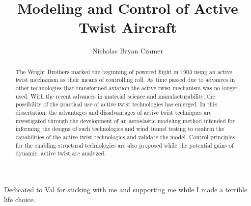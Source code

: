 \documentclass[11pt]{ucthesis}
\begin{document}

\title{Modeling and Control of Active Twist Aircraft}
\author{Nicholas Bryan Cramer}
\deanlinethree{}

\begin{frontmatter}

\maketitle
\copyrightpage

\tableofcontents
\listoffigures
\listoftables

\begin{abstract}
The Wright Brothers marked the beginning of powered flight in 1903 using an active twist mechanism as their means of controlling roll. As time passed due to advances in other technologies that transformed aviation the active twist mechanism was no longer used. With the recent advances in material science and manufacturability, the possibility of the practical use of active twist technologies has emerged. In this dissertation, the advantages and disadvantages of active twist techniques are investigated through the development of an aeroelastic modeling method intended for informing the designs of such technologies and wind tunnel testing to confirm the capabilities of the active twist technologies and validate the model. Control principles for the enabling structural technologies are also proposed while the potential gains of dynamic, active twist are analyzed.

\end{abstract}

\begin{dedication}
\null\vfil
{\large
\begin{center}
Dedicated to Val for sticking with me and supporting me while I made a terrible life choice. \\\vspace{12pt}

\end{center}}
\vfil\null
\end{dedication}



\end{frontmatter}
\end{document}
